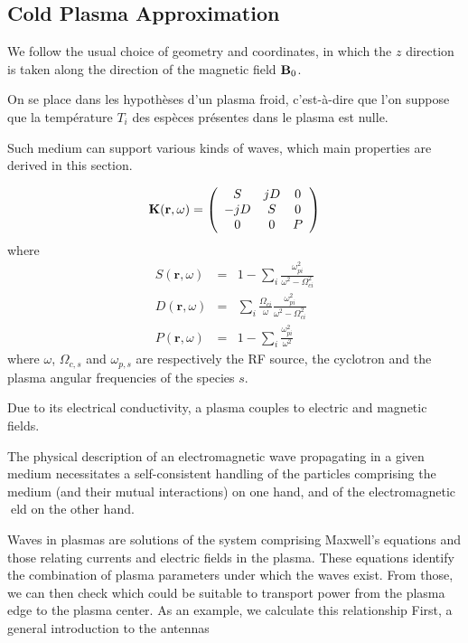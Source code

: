 \subsection{Cold Plasma Approximation}

We follow the usual choice of geometry and coordinates, in which the $z$ direction is taken along the direction of the magnetic field ${\mathbf B}_0$.  

On se place dans les hypothèses d'un plasma froid, c'est-à-dire que
l'on suppose que la température $T_{i}$ des espèces présentes dans
le plasma est nulle\cite[chap.5]{Brambilla1998}.




Such medium can support various kinds of waves, which main properties are derived in this section. 

\begin{equation}
{\mathbf K}({\mathbf r},\omega)
=
\left(\begin{array}{ccc}
	S & j D & 0\\
	-j D & S & 0\\
	0 & 0 & P
\end{array}\right)
\label{eq:stix_K}
\end{equation}
where
\begin{subequations}
	\begin{eqnarray}
	S(\mathbf{r},\omega) 
	& = & 
	1-\sum_{i}\frac{\omega_{pi}^{2}}{\omega^{2}-\Omega_{ci}^{2}}
	\label{eq:stix_S}
	\\
	D(\mathbf{r},\omega) 
	& = & 
	\sum_{i}\frac{\Omega_{ci}}{\omega}\frac{\omega_{pi}^{2}}{\omega^{2}-\Omega_{ci}^{2}}
	\label{eq:stix_D}
	\\
	P(\mathbf{r},\omega) 
	& = & 
	1-\sum_{i}\frac{\omega_{pi}^{2}}{\omega^{2}}
	\label{eq:stix_P}
	\end{eqnarray}
	\label{eq:stix_SDP}
\end{subequations}
where $\omega$, $\Omega_{c,s}$ and $\omega_{p,s}$ are respectively the RF source, the cyclotron and the plasma angular frequencies of the species $s$.


Due to its electrical conductivity, a plasma couples to electric and magnetic fields. 

The physical description of an electromagnetic wave propagating in a given medium
necessitates a self-consistent handling of the particles comprising the medium (and
their mutual interactions) on one hand, and of the electromagnetic eld on the other
hand.


Waves in plasmas are solutions of the system comprising Maxwell's equations and those relating currents and electric fields in the plasma. These
equations identify the combination of plasma parameters under which the waves
exist. From those, we can then check which could be suitable to transport power
from the plasma edge to the plasma center.
As an example, we calculate this relationship
First, a general introduction to the 
antennas


